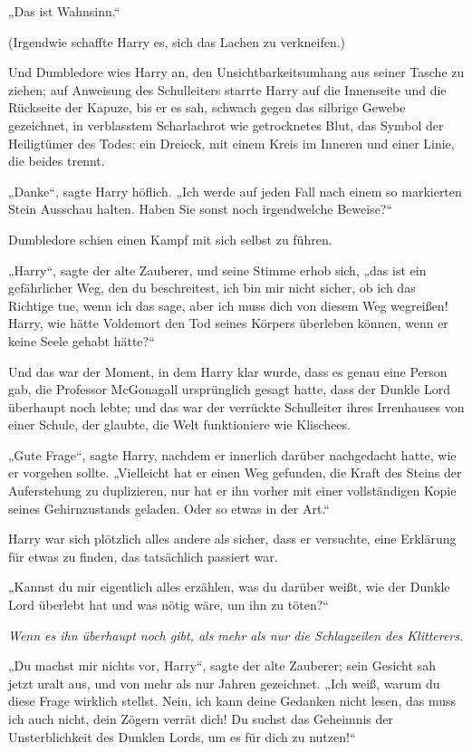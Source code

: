 {„Das ist Wahnsinn.“

(Irgendwie schaffte Harry es, sich das Lachen zu verkneifen.)

Und Dumbledore wies Harry an, den Unsichtbarkeitsumhang aus seiner Tasche zu ziehen; auf Anweisung des Schulleiters starrte Harry auf die Innenseite und die Rückseite der Kapuze, bis er es sah, schwach gegen das silbrige Gewebe gezeichnet, in verblasstem Scharlachrot wie getrocknetes Blut, das Symbol der Heiligtümer des Todes: ein Dreieck, mit einem Kreis im Inneren und einer Linie, die beides trennt.

„Danke“, sagte Harry höflich. „Ich werde auf jeden Fall nach einem so markierten Stein Ausschau halten. Haben Sie sonst noch irgendwelche Beweise?“

Dumbledore schien einen Kampf mit sich selbst zu führen.

„Harry“, sagte der alte Zauberer, und seine Stimme erhob sich, „das ist ein gefährlicher Weg, den du beschreitest, ich bin mir nicht sicher, ob ich das Richtige tue, wenn ich das sage, aber ich muss dich von diesem Weg wegreißen! Harry, wie hätte Voldemort den Tod seines Körpers überleben können, wenn er keine Seele gehabt hätte?“

Und das war der Moment, in dem Harry klar wurde, dass es genau eine Person gab, die Professor McGonagall ursprünglich gesagt hatte, dass der Dunkle Lord überhaupt noch lebte; und das war der verrückte Schulleiter ihres Irrenhauses von einer Schule, der glaubte, die Welt funktioniere wie Klischees.

„Gute Frage“, sagte Harry, nachdem er innerlich darüber nachgedacht hatte, wie er vorgehen sollte. „Vielleicht hat er einen Weg gefunden, die Kraft des Steins der Auferstehung zu duplizieren, nur hat er ihn vorher mit einer vollständigen Kopie seines Gehirnzustands geladen. Oder so etwas in der Art.“

Harry war sich plötzlich alles andere als sicher, dass er versuchte, eine Erklärung für etwas zu finden, das tatsächlich passiert war.

„Kannst du mir eigentlich alles erzählen, was du darüber weißt, wie der Dunkle Lord überlebt hat und was nötig wäre, um ihn zu töten?“

\emph{Wenn es ihn überhaupt noch gibt, als mehr als nur die Schlagzeilen des Klitterers.}

„Du machst mir nichts vor, Harry“, sagte der alte Zauberer; sein Gesicht sah jetzt uralt aus, und von mehr als nur Jahren gezeichnet. „Ich weiß, warum du diese Frage wirklich stellst. Nein, ich kann deine Gedanken nicht lesen, das muss ich auch nicht, dein Zögern verrät dich! Du suchst das Geheimnis der Unsterblichkeit des Dunklen Lords, um es für dich zu nutzen!“

}
